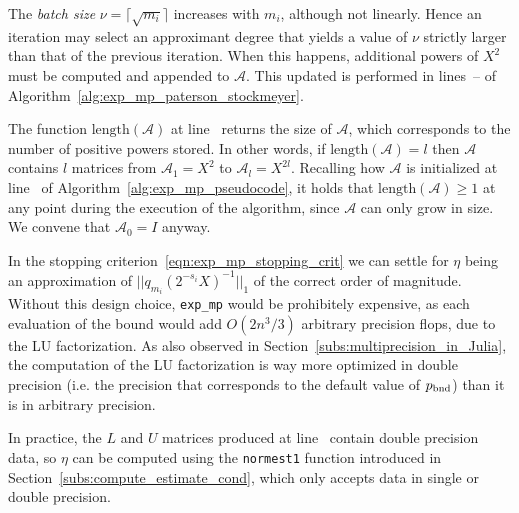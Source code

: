 The \emph{batch size} $\nu=\lceil\sqrt{m_i}\rceil$ increases with $m_i$, although not linearly. Hence an iteration may select an approximant degree that yields a value of $\nu$ strictly larger than that of the previous iteration. When this happens, additional powers of $X^2$ must be computed and appended to $\mathcal{A}$. This updated is performed in lines~-- of Algorithm~\ref{alg:exp_mp_paterson_stockmeyer}.
\begin{oss*}
	The function $\text{length}(\mathcal{A})$ at line~ returns the size of $\mathcal{A}$, which corresponds to the number of positive powers stored. In other words, if $\text{length}(\mathcal{A})=l$ then $\mathcal{A}$ contains $l$ matrices from $\mathcal{A}_1=X^2$ to $\mathcal{A}_l=X^{2l}$. Recalling how $\mathcal{A}$ is initialized at line~ of Algorithm~\ref{alg:exp_mp_pseudocode}, it holds that $\text{length}(\mathcal{A})\ge 1$ at any point during the execution of the algorithm, since $\mathcal{A}$ can only grow in size. We convene that $\mathcal{A}_0=I$ anyway.
\end{oss*}
\smallskip 

In the stopping criterion~\eqref{eqn:exp_mp_stopping_crit} we can settle for $\eta$ being an approximation of $\lvert\lvert q_{m_i}(2^{-s_i}X)^{-1}\rvert\rvert_1$ of the correct order of magnitude. 
Without this design choice, \texttt{exp\_mp} would be prohibitely expensive, as each evaluation of the bound would add $O(2n^3/3)$ arbitrary precision flops, due to the LU factorization. As also observed in Section~\ref{subs:multiprecision_in_Julia}, the computation of the LU factorization is way more optimized in double precision (i.e. the precision that corresponds to the default value of $p_{\textup{bnd}}$) than it is in arbitrary precision.

In practice, the $L$ and $U$ matrices produced at line~ contain double precision data, so $\eta$ can be computed using the \texttt{normest1} function introduced in Section~\ref{subs:compute_estimate_cond}, which only accepts data in single or double precision.

